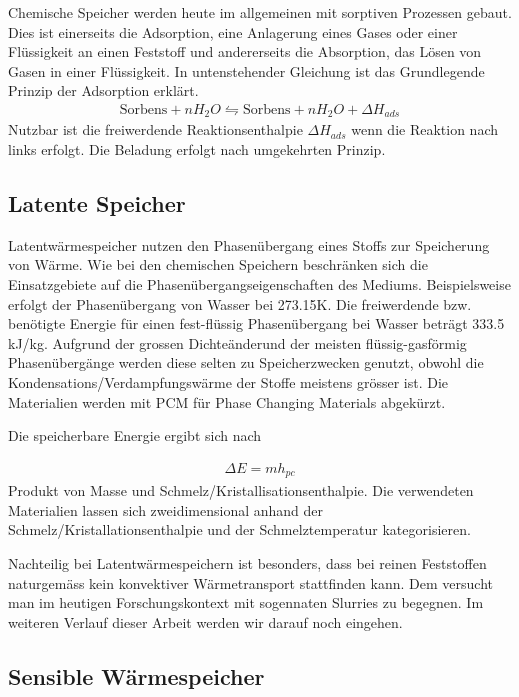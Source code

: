 \documentclass[11pt,a4paper]{scrartcl}
\begin{document}
Chemische Speicher werden heute im allgemeinen mit sorptiven Prozessen gebaut.
Dies ist einerseits die Adsorption, eine Anlagerung eines Gases oder einer
Flüssigkeit an einen Feststoff und andererseits die Absorption, das Lösen von
Gasen in einer Flüssigkeit. In untenstehender Gleichung ist das Grundlegende
Prinzip der Adsorption erklärt.
\begin{align}
\text{Sorbens}+nH_2O\leftrightharpoons \text{Sorbens}+nH_2O+\Delta H_{ads}
\end{align}
Nutzbar ist die freiwerdende Reaktionsenthalpie $\Delta H_{ads}$ wenn die
Reaktion nach links erfolgt. Die Beladung erfolgt nach umgekehrten Prinzip.  
\cite{Wesselak}

\subsection{Latente Speicher}
Latentwärmespeicher nutzen den Phasenübergang eines Stoffs zur Speicherung von
Wärme. Wie bei den chemischen Speichern beschränken sich die Einsatzgebiete auf
die Phasenübergangseigenschaften des Mediums. Beispielsweise erfolgt der
Phasenübergang von Wasser bei 273.15K. Die freiwerdende bzw. benötigte Energie
für einen fest-flüssig Phasenübergang bei Wasser beträgt 333.5 kJ/kg.
Aufgrund der grossen Dichteänderund der meisten flüssig-gasförmig
Phasenübergänge werden diese selten zu Speicherzwecken genutzt, obwohl die
Kondensations/Verdampfungswärme der Stoffe meistens grösser ist. Die Materialien
werden mit PCM für \flqq Phase Changing Materials\frqq{} abgekürzt.

Die speicherbare Energie ergibt sich nach

\begin{align}
\Delta E = mh_{pc}
\end{align}
Produkt von Masse und Schmelz/Kristallisationsenthalpie. Die verwendeten
Materialien lassen sich zweidimensional anhand der
Schmelz/Kristallationsenthalpie und der Schmelztemperatur kategorisieren. 

Nachteilig bei Latentwärmespeichern ist besonders, dass bei reinen Feststoffen
naturgemäss kein konvektiver Wärmetransport stattfinden kann. Dem versucht man
im heutigen Forschungskontext mit sogennaten Slurries zu begegnen. Im weiteren
Verlauf dieser Arbeit werden wir darauf noch eingehen. \cite{Wesselak}

\subsection{Sensible Wärmespeicher}
\end{document}
